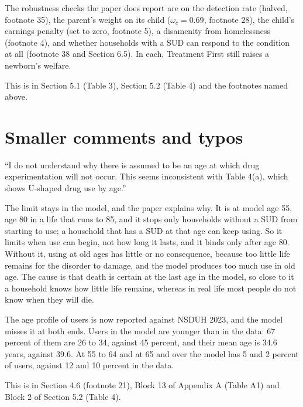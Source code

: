 \documentclass[11pt]{article}
\begin{document}
\begin{response}
The robustness checks the paper does report are on the detection rate (halved,
footnote 35), the parent's weight on its child ($\omega_c=0.69$, footnote 28),
the child's earnings penalty (set to zero, footnote 5), a disamenity from
homelessness (footnote 4), and whether households with a SUD can respond to the
condition at all (footnote 38 and Section 6.5). In each, Treatment First still
raises a newborn's welfare.

This is in Section 5.1 (Table 3), Section 5.2 (Table 4) and the footnotes named
above.
\end{response}

\section*{Smaller comments and typos}

\begin{referee}
``I do not understand why there is assumed to be an age at which drug
experimentation will not occur. This seems inconsistent with Table 4(a), which
shows U-shaped drug use by age.''
\end{referee}
\begin{response}
\open The limit stays in the model, and the paper explains why. It is at model
age 55, age 80 in a life that runs to 85, and it stops only households without a
SUD from starting to use; a household that has a SUD at that age can keep using.
So it limits when use can begin, not how long it lasts, and it binds only after
age 80. Without it, using at old ages has little or no consequence, because too
little life remains for the disorder to damage, and the model produces too much
use in old age. The cause is that death is certain at the last age in the model,
so close to it a household knows how little life remains, whereas in real life
most people do not know when they will die.

The age profile of users is now reported against NSDUH 2023, and the model misses
it at both ends. Users in the model are younger than in the data: 67 percent of
them are 26 to 34, against 45 percent, and their mean age is 34.6 years, against
39.6. At 55 to 64 and at 65 and over the model has 5 and 2 percent of users,
against 12 and 10 percent in the data.

This is in Section 4.6 (footnote 21), Block 13 of Appendix A (Table A1) and Block
2 of Section 5.2 (Table 4).
\end{response}
\end{document}
